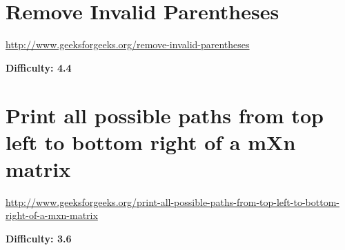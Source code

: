 \section{Remove Invalid Parentheses
  \label{secGFGBktrckRemoveInvalidParentheses}}

\url{http://www.geeksforgeeks.org/remove-invalid-parentheses}

\textbf{Difficulty: 4.4}

\textbf{}

\RayNotesBegin



\RayNotesEnd

\textbf{}





\section{Print all possible paths from top left to bottom right of a mXn matrix
  \label{secGFGBktrckPrintPathsOfmxnMat}}

\url{http://www.geeksforgeeks.org/print-all-possible-paths-from-top-left-to-bottom-right-of-a-mxn-matrix}

\textbf{Difficulty: 3.6}

\textbf{}

\RayNotesBegin



\RayNotesEnd

\textbf{}
















































